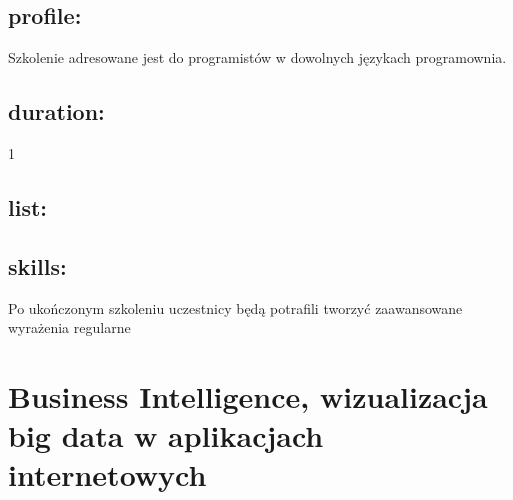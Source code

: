 \documentclass{article}[10pt]
\begin{document}
	\subsection*{profile:}
\begin{adjustwidth}{2cm}{}
	
Szkolenie adresowane jest do programistów w dowolnych językach programownia.
\end{adjustwidth}
	\subsection*{duration:}
\begin{adjustwidth}{2cm}{}
	1
\end{adjustwidth}

	\subsection*{list:}
\begin{adjustwidth}{1.5cm}{}
	\begin{itemize}





	\end{itemize}
\end{adjustwidth}

	\subsection*{skills:}
\begin{adjustwidth}{2cm}{}
	
Po ukończonym szkoleniu uczestnicy będą potrafili tworzyć zaawansowane wyrażenia regularne
\end{adjustwidth}

\newpage


    
	\section{Business Intelligence, wizualizacja big data w aplikacjach internetowych}
\end{document}
